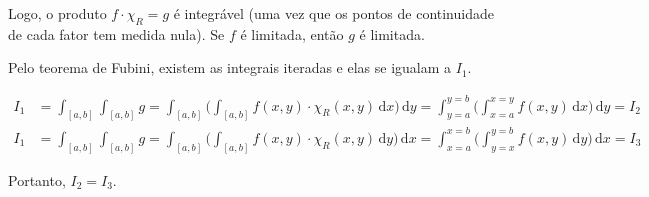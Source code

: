 \documentclass[12pt,a4paper]{article}
\begin{document}
		Logo, o produto $f \cdot \chi_R = g$ \'e integr\'avel (uma vez que os pontos de continuidade de cada fator tem medida nula). Se $f$ \'e limitada, ent\~ao $g$ \'e limitada.

		Pelo teorema de Fubini, existem as integrais iteradas e elas se igualam a $I_1$.

		\begin{align}
				I_1 &= \int_{[a,b]} \int_{[a,b]} g = \int_{[a,b]} \biggl( \int_{[a,b]} f(x,y) \cdot \chi_R(x,y) \,\mathrm{d}x \biggl) \,\mathrm{d}y  = \int_{y = a}^{y = b} \biggl( \int_{x = a}^{x = y} f(x,y) \,\mathrm{d}x \biggl) \,\mathrm{d}y = I_2 \\
				I_1 &= \int_{[a,b]} \int_{[a,b]} g = \int_{[a,b]} \biggl( \int_{[a,b]} f(x,y) \cdot \chi_R(x,y) \,\mathrm{d}y \biggl) \,\mathrm{d}x  = \int_{x = a}^{x = b} \biggl( \int_{y = x}^{y = b} f(x,y) \,\mathrm{d}y \biggl) \,\mathrm{d}x = I_3
		\end{align}

		Portanto, $I_2 = I_3$.

		\begin{flushright}
		\end{flushright}

		\begin{flushright}
		\end{flushright}

		\begin{flushright}
		\end{flushright}
\end{document}
